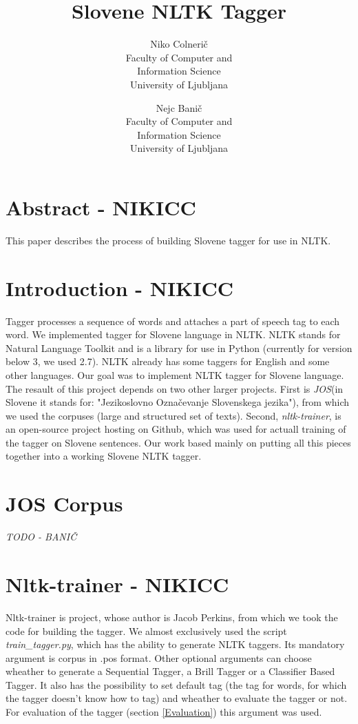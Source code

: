 \documentclass[11pt,a4paper,english,twocolumn]{article}
\title{\textbf{Slovene NLTK Tagger}}
\author{
Niko Colnerič \\
\footnotesize Faculty of Computer and \\
\footnotesize Information Science \\
\footnotesize University of Ljubljana \\
\and
Nejc Banič \\
\footnotesize Faculty of Computer and \\
\footnotesize Information Science \\
\footnotesize University of Ljubljana \\
}
\begin{document}
\maketitle
\thispagestyle{empty}

\section*{Abstract - NIKICC}
This paper describes the process of building Slovene tagger for use in NLTK.  
\section{Introduction - NIKICC}
Tagger processes a sequence of words and attaches a part of speech tag to each word. We implemented tagger for Slovene language in NLTK. NLTK stands for Natural Language Toolkit and is a library for use in Python (currently for version below 3, we used 2.7). NLTK already has some taggers for English and some other languages. Our goal was to implement NLTK tagger for Slovene language. The resault of this project depends on two other larger projects. First is \textit{JOS}\cite{JOS}(in Slovene it stands for: "Jezikoslovno Označevanje Slovenskega jezika"), from which we used the corpuses (large and structured set of texts). Second, \textit{nltk-trainer}\cite{nltk-trainer}, is an open-source project hosting on Github, which was used for actuall training of the tagger on Slovene sentences. Our work based mainly on putting all this pieces together into a working Slovene NLTK tagger.
\section{JOS Corpus}
\textit{TODO - BANIČ}
\section{Nltk-trainer - NIKICC}
Nltk-trainer\cite{nltk-trainer} is project, whose author is Jacob Perkins, from which we took the code for building the tagger. We almost exclusively used the script \textit{train\_tagger.py}, which has the ability to generate NLTK taggers. Its mandatory argument is corpus in .pos format. Other optional arguments can choose wheather to generate a Sequential Tagger, a Brill Tagger or a Classifier Based Tagger. It also has the possibility to set default tag (the tag for words, for which the tagger doesn't know how to tag) and wheather to evaluate the tagger or not. For evaluation of the tagger (section \ref{Evaluation}) this argument was used. 
\end{document}
